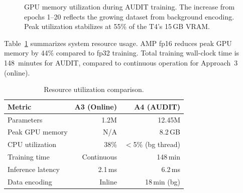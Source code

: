 \documentclass[letterpaper,twocolumn,10pt]{article}
\begin{document}
\begin{figure}[t]
\centering
{}
\caption{GPU memory utilization during AUDIT training.  The
increase from epochs 1--20 reflects the growing dataset from
background encoding.  Peak utilization stabilizes at 55\% of the
T4's 15\,GB VRAM.}
\label{fig:gpu}
\end{figure}

Table~\ref{tab:resources} summarizes system resource usage.  AMP
fp16 reduces peak GPU memory by 44\% compared to fp32 training.
Total training wall-clock time is 148~minutes for AUDIT, compared
to continuous operation for Approach~3 (online).

\begin{table}[t]
\centering
\caption{Resource utilization comparison.}
\label{tab:resources}
\small
\begin{tabular}{@{}lrr@{}}
\toprule
\textbf{Metric} & \textbf{A3 (Online)} & \textbf{A4 (AUDIT)} \\
\midrule
Parameters           & 1.2M    & 12.45M \\
Peak GPU memory      & N/A     & 8.2\,GB \\
CPU utilization      & 38\%    & $<$5\% (bg thread) \\
Training time        & Continuous & 148\,min \\
Inference latency    & 2.1\,ms & 6.2\,ms \\
Data encoding        & Inline  & 18\,min (bg) \\
\bottomrule
\end{tabular}
\end{table}
\end{document}
